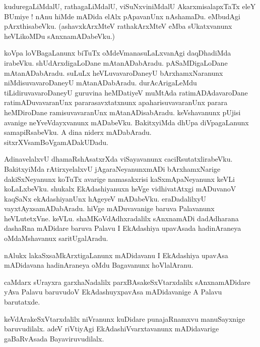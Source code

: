 \documentclass{article}
\begin{document}
\begin{mn}%
kuduregaLiMdalU, rathagaLiMdalU, viSuNxviniMdalU AkarxmisalapxTaTx eleY BUmiye ! nAnu hiMde mADida 
elAlx pApavanUnx nAshamaDu. eMbudAgi pArxthisabeVku. (ashavxkArxMteV rathakArxMteV eMba 
sUkatxvanunx heVLikoMDu sAnxnamADabeVku.)
\end{mn}

\begin{mn}%
koVpa loVBagaLanunx biTuTx oMdeVmanasuLaLxvanAgi daqDhadiMda irabeVku. shUdArxdigaLoDane 
mAtanADabAradu. pASaMDigaLoDane mAtanADabAradu. suLuLx heVLuvavaroDaneyU bArxhamxNaranunx 
niMdisuvavaroDaneyU mAtanADabAradu. durAcArigaLeMdu tiLidiruvavaroDaneyU guruvina heMDatiyeV 
muMtAda ratimADAdavaroDane ratimADuvavaranUnx pararasavxtatxnunx apaharisuvavaranUnx parara 
heMDiroDane ramisuvavaranUnx mAtanADisabAradu. keVshavanunx pUjisi avanige neYveVdayxvanunx 
mADabeVku. BakitxyiMda dhUpa diVpagaLanunx samapiRsabeVku. A dina niderx mADabAradu. 
sitxrXVsamBoVgamADakUDadu.
\end{mn}

\begin{mn}%
AdinavelalxvU dhamaRshAsatxrXda viSayavanunx caciRsutatxlirabeVku. BakitxyiMda rAtirxyelalxvU 
jAgaraNeyanunxmADi bArxhamxNarige dakiSxNeyanunx koTuTx avarige namasakxrisi kaSxmApaNeyanunx 
keVLi koLaLxbeVku. shukalx EkAdashiyanuxn heVge vidhivatAtxgi mADuvanoV kaqSaNx ekAdashiyanUnx 
hAgeyeV mADabeVku. eraDadalilxyU vayxtAyxsamADabAradu. hiVge mADuvavanige baruva Palavanunx 
heVLutetxVne. keVLu. shaMKoVdAdhxradalilx sAnxnamADi dadAdharana dashaRna mADidare baruva Palavu I 
EkAdashiya upavAsada hadinAraneya oMdaMshavanux saritUgalAradu.
\end{mn}

\begin{mn}%
nAlukx lakaSxsaMkArxtigaLanunx mADidavanu I EkAdashiya upavAsa mADidavana hadinAraneya oMdu 
Bagavanunx hoVlalAranu.
\end{mn}

\begin{mn}%
caMdarx sUrayxra garxhaNadalilx parxBAsakeSxVtarxdalilx sAnxnamADidare yAva Palavu baruvudoV 
EkAdashuyxpavAsa mADidavanige A Palavu barutatxde.
\end{mn}

\begin{mn}%
keVdArakeSxVtarxdalilx niVranunx kuDidare punajaRnamxvu manuSayxnige baruvudilalx. adeV riVtiyAgi 
EkAdashiVvarxtavanunx mADidavarige gaBaRvAsada Bayaviruvudilalx.
\end{mn}
\end{document}
